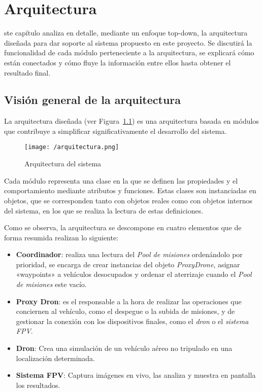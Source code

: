\chapter{Arquitectura}
\label{chap:arquitectura}

ste capítulo analiza en detalle, mediante un enfoque top-down, la arquitectura diseñada para dar soporte al sistema propuesto en este proyecto. Se discutirá la funcionalidad de cada módulo perteneciente a la arquitectura, se explicará cómo están conectados y cómo fluye la información entre ellos hasta obtener el resultado final. 

\section{Visión general de la arquitectura}
\label{sec:visiongeneral}

La arquitectura diseñada (ver Figura~\ref{fig:arquitectura}) es una arquitectura basada en módulos que contribuye a simplificar significativamente el desarrollo del sistema.

\begin{figure}[!h]
\begin{center}
\texttt{[image: /arquitectura.png]}
\caption[Arquitectura del sistema]{Arquitectura del sistema}
\label{fig:arquitectura}
\end{center}
\end{figure}

Cada módulo representa una clase en la que se definen las propiedades y el comportamiento mediante atributos y funciones. Estas clases son instanciadas en objetos, que se corresponden tanto con objetos reales como con objetos internos del sistema, en los que se realiza la lectura de estas definiciones.

Como se observa, la arquitectura se descompone en cuatro elementos que de forma resumida realizan lo siguiente:
\begin{itemize}
\item \textbf{Coordinador}: realiza una lectura del \textit{Pool de misiones} ordenándolo por prioridad, se encarga de crear instancias del objeto \textit{ProxyDrone}, asignar «waypoints» a vehículos desocupados y ordenar el aterrizaje cuando el \textit{Pool de misiones} este vacío.
\item \textbf{Proxy Dron}: es el responsable a la hora de realizar las operaciones que conciernen al vehículo, como el despegue o la subida de misiones, y de gestionar la conexión con los dispositivos finales, como el \textit{dron} o el \textit{sistema \acs{FPV}}.
\item \textbf{Dron}: Crea una simulación de un vehículo aéreo no tripulado en una localización determinada.
\item \textbf{Sistema FPV}: Captura imágenes en vivo, las analiza y muestra en pantalla los resultados.
\end{itemize} 

